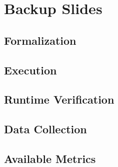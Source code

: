 \documentclass[aspectratio=169]{beamer}
\begin{document}











\section{Backup Slides}
\sectionFrame{}

\subsection{Formalization}


\subsection{Execution}


\subsection{Runtime Verification}




\subsection{Data Collection}


\subsection{Available Metrics}
\end{document}
